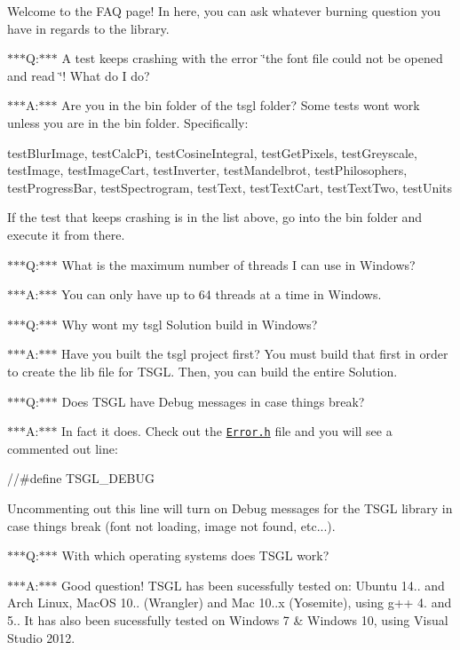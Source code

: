 Welcome to the F\+A\+Q page! In here, you can ask whatever burning question you have in regards to the library.

$\ast$$\ast$$\ast$\+Q\+:$\ast$$\ast$$\ast$ A test keeps crashing with the error \char`\"{}the font file could not be opened and read
\char`\"{}! What do I do?

$\ast$$\ast$$\ast$\+A\+:$\ast$$\ast$$\ast$ Are you in the bin folder of the tsgl folder? Some tests won\textquotesingle{}t work unless you are in the bin folder. Specifically\+:

{\ttfamily test\+Blur\+Image}, {\ttfamily test\+Calc\+Pi}, {\ttfamily test\+Cosine\+Integral}, {\ttfamily test\+Get\+Pixels}, {\ttfamily test\+Greyscale}, {\ttfamily test\+Image}, {\ttfamily test\+Image\+Cart}, {\ttfamily test\+Inverter}, {\ttfamily test\+Mandelbrot}, {\ttfamily test\+Philosophers}, {\ttfamily test\+Progress\+Bar}, {\ttfamily test\+Spectrogram}, {\ttfamily test\+Text}, {\ttfamily test\+Text\+Cart}, {\ttfamily test\+Text\+Two}, {\ttfamily test\+Units}

If the test that keeps crashing is in the list above, go into the bin folder and execute it from there.

$\ast$$\ast$$\ast$\+Q\+:$\ast$$\ast$$\ast$ What is the maximum number of threads I can use in Windows?

$\ast$$\ast$$\ast$\+A\+:$\ast$$\ast$$\ast$ You can only have up to 64 threads at a time in Windows.

$\ast$$\ast$$\ast$\+Q\+:$\ast$$\ast$$\ast$ Why won\textquotesingle{}t my tsgl Solution build in Windows?

$\ast$$\ast$$\ast$\+A\+:$\ast$$\ast$$\ast$ Have you built the tsgl project first? You must build that first in order to create the lib file for T\+S\+G\+L. Then, you can build the entire Solution.

$\ast$$\ast$$\ast$\+Q\+:$\ast$$\ast$$\ast$ Does T\+S\+G\+L have Debug messages in case things break?

$\ast$$\ast$$\ast$\+A\+:$\ast$$\ast$$\ast$ In fact it does. Check out the \href{http://calvin-cs.github.io/TSGL/html/_error_8h_source.html}{\tt Error.\+h} file and you will see a commented out line\+:


\begin{DoxyCode}
\textcolor{comment}{//#define TSGL\_DEBUG}
\end{DoxyCode}


Uncommenting out this line will turn on Debug messages for the T\+S\+G\+L library in case things break (font not loading, image not found, etc...).

$\ast$$\ast$$\ast$\+Q\+:$\ast$$\ast$$\ast$ With which operating systems does T\+S\+G\+L work?

$\ast$$\ast$$\ast$\+A\+:$\ast$$\ast$$\ast$ Good question! T\+S\+G\+L has been sucessfully tested on\+: Ubuntu 14.. and Arch Linux, Mac\+O\+S 10.. (Wrangler) and Mac 10..\+x (Yosemite), using g++ 4. and 5.. It has also been sucessfully tested on Windows 7 \& Windows 10, using Visual Studio 2012. 